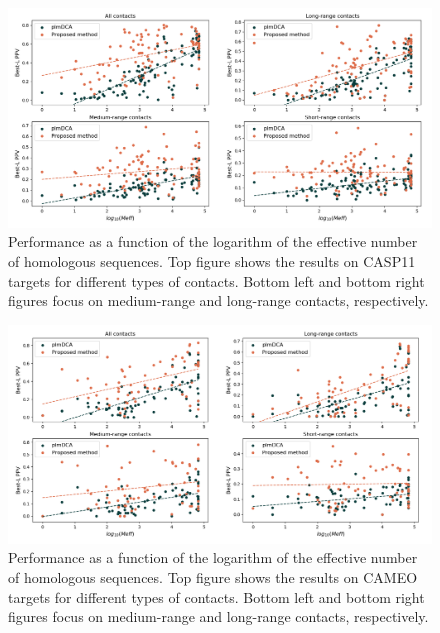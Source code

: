     \begin{figure}[H]
        \begin{center}
            \includegraphics[width=\textwidth, keepaspectratio]{imgs/Meff.png}
            \caption{Performance as a function of the logarithm of the effective
            number of homologous sequences. Top figure shows the results on
            CASP11 targets for different types of contacts. Bottom left and bottom right figures
            focus on medium-range and long-range contacts, respectively.}
            \label{sensitivity}
        \end{center}
    \end{figure}

    \begin{figure}[H]
        \begin{center}
            \includegraphics[width=\textwidth, keepaspectratio]{imgs/Meff_cameo.png}
            \caption{Performance as a function of the logarithm of the effective
            number of homologous sequences. Top figure shows the results on
            CAMEO targets for different types of contacts. Bottom left and bottom right figures
            focus on medium-range and long-range contacts, respectively.}
            \label{sensitivity}
        \end{center}
    \end{figure}

